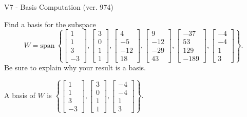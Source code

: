 \begin{exercise}
  \begin{exerciseTitle}V7 - Basis Computation (ver. 974)\end{exerciseTitle}
  \begin{exerciseStatement}
    Find a basis for the subspace 
\[W=\mathrm{span}\ \left\{\left[\begin{array}{r}
1 \\
1 \\
3 \\
-3
\end{array}\right] , \left[\begin{array}{r}
3 \\
0 \\
1 \\
1
\end{array}\right] , \left[\begin{array}{r}
4 \\
-5 \\
-12 \\
18
\end{array}\right] , \left[\begin{array}{r}
9 \\
-12 \\
-29 \\
43
\end{array}\right] , \left[\begin{array}{r}
-37 \\
53 \\
129 \\
-189
\end{array}\right] , \left[\begin{array}{r}
-4 \\
-4 \\
1 \\
3
\end{array}\right]\right\}.\]
 Be sure to explain why your result is a basis.


  \end{exerciseStatement}
  \begin{exerciseAnswer}
   A basis of \(W\) is  \(\left\{\left[\begin{array}{r}
1 \\
1 \\
3 \\
-3
\end{array}\right] , \left[\begin{array}{r}
3 \\
0 \\
1 \\
1
\end{array}\right] , \left[\begin{array}{r}
-4 \\
-4 \\
1 \\
3
\end{array}\right]\right\}\).
  


  \end{exerciseAnswer}
\end{exercise}